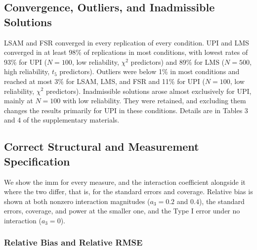 \documentclass[
  man,
  longtable,
  nolmodern,
  notxfonts,
  notimes,
  colorlinks=true,linkcolor=blue,citecolor=blue,urlcolor=blue]{apa7}
\begin{document}
\subsection{Convergence, Outliers, and Inadmissible
Solutions}\label{convergence-outliers-and-inadmissible-solutions-1}

LSAM and FSR converged in every replication of every condition. UPI and
LMS converged in at least 98\% of replications in most conditions, with
lowest rates of 93\% for UPI (\(N = 100\), low reliability, \(\chi^2\)
predictors) and 89\% for LMS (\(N = 500\), high reliability, \(t_5\)
predictors). Outliers were below 1\% in most conditions and reached at
most 3\% for LSAM, LMS, and FSR and 11\% for UPI (\(N = 100\), low
reliability, \(\chi^2\) predictors). Inadmissible solutions arose almost
exclusively for UPI, mainly at \(N = 100\) with low reliability. They
were retained, and excluding them changes the results primarily for UPI
in these conditions. Details are in Tables 3 and 4 of the supplementary
materials.

\subsection{Correct Structural and Measurement
Specification}\label{correct-structural-and-measurement-specification}

We show the imm for every measure, and the interaction coefficient
alongside it where the two differ, that is, for the standard errors and
coverage. Relative bias is shown at both nonzero interaction magnitudes
(\(a_3 = 0.2\) and \(0.4\)), the standard errors, coverage, and power at
the smaller one, and the Type I error under no interaction
(\(a_3 = 0\)).

\subsubsection{Relative Bias and Relative
RMSE}\label{relative-bias-and-relative-rmse}
\end{document}
